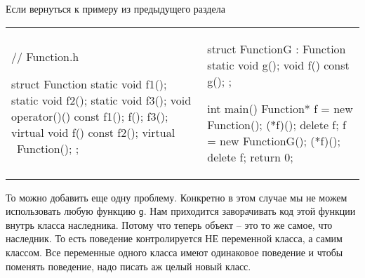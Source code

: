 Если вернуться к примеру из предыдущего раздела
\begin{center}
\begin{tabular}{ll}
{
\begin{minipage}[\baselineskip]{5cm}
\begin{cppcode}[numbers = none, linewidth=5cm]
// Function.h

struct Function {
  static void f1();
  static void f2();
  static void f3();
  void operator()() const {
    f1();
    f();
    f3();
  }
  virtual void f() const {
    f2();
  }
  virtual ~Function();
};
\end{cppcode}
\end{minipage}
}&{
\begin{minipage}[\baselineskip]{5.5cm}
\begin{cppcode}[numbers = none, linewidth=5.5cm]
struct FunctionG : Function {
  static void g();
  void f() const {
    g();
  }
};

int main() {
  Function* f = new Function();
  (*f)();
  delete f;
  f = new FunctionG();
  (*f)();
  delete f;
  return 0;
}
\end{cppcode}
\end{minipage}
}
\end{tabular}
\end{center}
То можно добавить еще одну проблему.
Конкретно в этом случае мы не можем использовать любую функцию \texttt{g}.
Нам приходится заворачивать код этой функции внутрь класса наследника.
Потому что теперь объект -- это то же самое, что наследник.
То есть поведение контролируется НЕ переменной класса, а самим классом.
Все переменные одного класса имеют одинаковое поведение и чтобы поменять поведение, надо писать аж целый новый класс.
